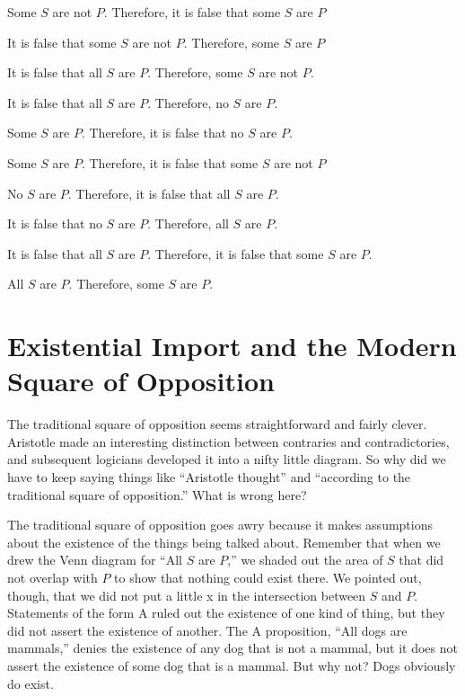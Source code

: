\begin{exercises}
\item Some $S$ are not $P$. Therefore, it is false that some $S$ are $P$ 
\item It is false that some $S$ are not $P$. Therefore, some $S$ are $P$  
\item It is false that all $S$ are $P$. Therefore, some $S$ are not $P$.  
\item It is false that all $S$ are $P$. Therefore, no $S$ are $P$.
\item Some $S$ are $P$. Therefore, it is false that no $S$ are $P$.
\item Some $S$ are $P$. Therefore, it is false that some $S$ are not $P$
\item No $S$ are $P$. Therefore, it is false that all $S$ are $P$.
\item It is false that no $S$ are $P$. Therefore, all $S$ are $P$.
\item It is false that all $S$ are $P$. Therefore, it is false that some $S$ are $P$.
\item All $S$ are $P$. Therefore, some $S$ are $P$.
\end{exercises}


\section{Existential Import and the Modern Square of Opposition}
\label{sec:ExistentialImport}

The traditional square of opposition seems straightforward and fairly clever. Aristotle made an interesting distinction between contraries and contradictories, and subsequent logicians developed it into a nifty little diagram. So why did we have to keep saying things like ``Aristotle thought'' and ``according to the traditional square of opposition.'' What is wrong here?

The traditional square of opposition goes awry because it makes assumptions about the existence of the things being talked about. Remember that when we drew the Venn diagram for ``All $S$ are $P$,'' we shaded out the area of $S$ that did not overlap with $P$ to show that nothing could exist there. We pointed out, though, that we did not put a little x in the intersection between $S$ and $P$. Statements of the form A ruled out the existence of one kind of thing, but they did not assert the existence of another. The A proposition, ``All dogs are mammals,'' denies the existence of any dog that is not a mammal, but it does not assert the existence of some dog that is a mammal. But why not? Dogs obviously do exist.


